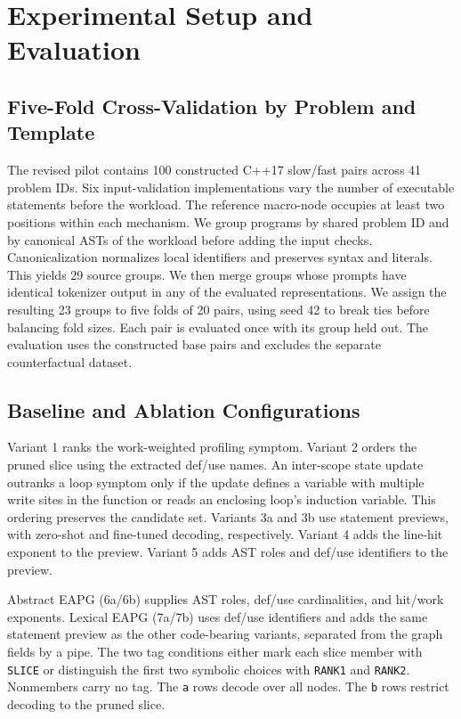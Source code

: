 \section{Experimental Setup and Evaluation}
\label{sec:experimental_setup}

\subsection{Five-Fold Cross-Validation by Problem and Template}
The revised pilot contains 100 constructed C++17 slow/fast pairs across 41 problem IDs. Six input-validation implementations vary the number of executable statements before the workload. The reference macro-node occupies at least two positions within each mechanism. We group programs by shared problem ID and by canonical ASTs of the workload before adding the input checks. Canonicalization normalizes local identifiers and preserves syntax and literals. This yields 29 source groups. We then merge groups whose prompts have identical tokenizer output in any of the evaluated representations. We assign the resulting 23 groups to five folds of 20 pairs, using seed 42 to break ties before balancing fold sizes. Each pair is evaluated once with its group held out. The evaluation uses the constructed base pairs and excludes the separate counterfactual dataset.

\subsection{Baseline and Ablation Configurations}
Variant 1 ranks the work-weighted profiling symptom. Variant 2 orders the pruned slice using the extracted def/use names. An inter-scope state update outranks a loop symptom only if the update defines a variable with multiple write sites in the function or reads an enclosing loop's induction variable. This ordering preserves the candidate set. Variants 3a and 3b use statement previews, with zero-shot and fine-tuned decoding, respectively. Variant 4 adds the line-hit exponent to the preview. Variant 5 adds AST roles and def/use identifiers to the preview.

Abstract EAPG (6a/6b) supplies AST roles, def/use cardinalities, and hit/work exponents. Lexical EAPG (7a/7b) uses def/use identifiers and adds the same statement preview as the other code-bearing variants, separated from the graph fields by a pipe. The two tag conditions either mark each slice member with \texttt{SLICE} or distinguish the first two symbolic choices with \texttt{RANK1} and \texttt{RANK2}. Nonmembers carry no tag. The \texttt{a} rows decode over all nodes. The \texttt{b} rows restrict decoding to the pruned slice.


